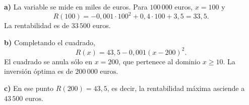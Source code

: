 \textbf{a)} La variable se mide en miles de euros. Para $100\,000$ euros, $x=100$ y
\[
R(100)=-0{,}001\cdot100^2+0{,}4\cdot100+3{,}5=33{,}5.
\]
La rentabilidad es de $33\,500$ euros.

\textbf{b)} Completando el cuadrado,
\[
R(x)=43{,}5-0{,}001(x-200)^2.
\]
El cuadrado se anula sólo en $x=200$, que pertenece al dominio $x\ge10$. La inversión óptima es de $\boxed{200\,000\text{ euros}}$.

\textbf{c)} En ese punto $R(200)=43{,}5$, es decir, la rentabilidad máxima asciende a $\boxed{43\,500\text{ euros}}$.
